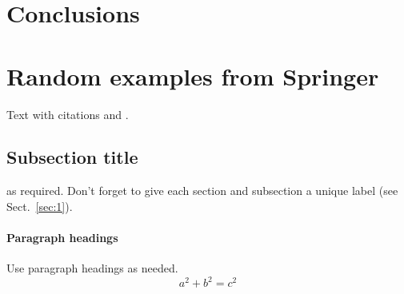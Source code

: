 \section{Conclusions}
\label{sec:conclusions}


\section*{Random examples from Springer}


Text with citations \cite{RefB} and \cite{RefJ}.

\subsection{Subsection title}
\label{sec:2}
as required. Don't forget to give each section
and subsection a unique label (see Sect.~\ref{sec:1}).
\paragraph{Paragraph headings} Use paragraph headings as needed.
\begin{equation}
a^2+b^2=c^2
\end{equation}

